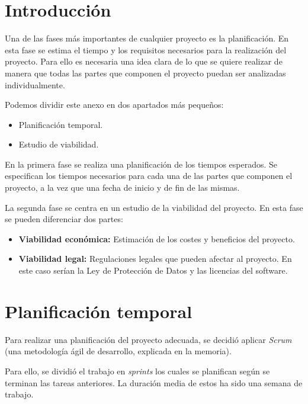 
\section{Introducción}

Una de las fases más importantes de cualquier proyecto es la planificación. En esta fase se estima el tiempo y los requisitos necesarios para la realización del proyecto. Para ello es necesaria una idea clara de lo que se quiere realizar de manera que todas las partes que componen el proyecto puedan ser analizadas individualmente.

Podemos dividir este anexo en dos apartados más pequeños:

\begin{itemize}
\item
  Planificación temporal.
\item
  Estudio de viabilidad.
\end{itemize}

En la primera fase se realiza una planificación de los tiempos esperados. Se especifican los tiempos necesarios para cada una de las partes que componen el proyecto, a la vez que una fecha de inicio y de fin de las mismas.

La segunda fase se centra en un estudio de la viabilidad del proyecto. En esta fase se pueden diferenciar dos partes:

\begin{itemize}
\item
\textbf{Viabilidad económica:} Estimación de los costes y beneficios del proyecto.
\item
\textbf{Viabilidad legal:} Regulaciones legales que pueden afectar al proyecto. En este caso serían la Ley de Protección de Datos y las licencias del software.
\end{itemize}

\section{Planificación temporal}

Para realizar una planificación del proyecto adecuada, se decidió aplicar \emph{Scrum} (una metodología ágil de desarrollo, explicada en la memoria).

Para ello, se dividió el trabajo en \emph{sprints} los cuales se planifican según se terminan las tareas anteriores. La duración media de estos ha sido una semana de trabajo.

